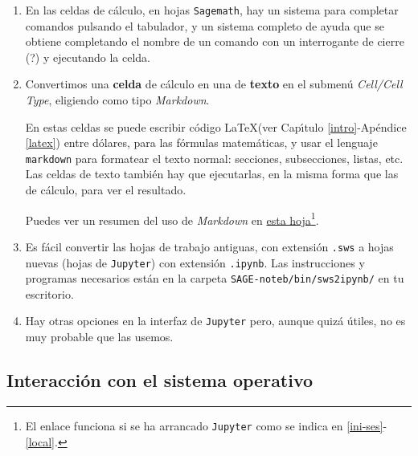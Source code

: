 \begin{enumerate}
\item En las celdas de c\'alculo, en hojas {\tt Sagemath},  hay un sistema para completar comandos pulsando el tabulador, y un sistema completo de ayuda que se obtiene completando el nombre de un comando con un interrogante de cierre (?) y ejecutando la celda. 



\item Convertimos una {\bf celda} de c\'alculo en una de {\bf texto} en el submen\'u {\itshape Cell/Cell Type}, eligiendo como tipo {\itshape Markdown}.

En estas celdas se puede escribir c\'odigo {\LaTeX}(ver Cap\'{\i}tulo \ref{intro}-Ap\'endice \ref{latex}) entre d\'olares, para las f\'ormulas matem\'aticas, y usar el lenguaje {\tt markdown} para formatear el texto normal: secciones, subsecciones, listas, etc.
Las celdas de texto tambi\'en hay que ejecutarlas, en la misma forma que las de c\'alculo, para ver el resultado. 

Puedes ver un resumen  del uso de {\itshape Markdown} en 
\href{http://localhost:8888/notebooks/INTRO/markdown.ipynb}{esta hoja}\footnote{El enlace funciona si se ha arrancado {\tt Jupyter} como se indica en  \ref{ini-ses}-\ref{local}.}.


\item Es f\'acil convertir las hojas de trabajo antiguas, con extensi\'on {\tt .sws} a hojas nuevas (hojas de {\tt Jupyter}) con extensi\'on {\tt .ipynb}. Las instrucciones y programas necesarios est\'an en la carpeta {\tt SAGE-noteb/bin/sws2ipynb/}  en tu escritorio. 



\item Hay otras opciones en la interfaz de {\tt Jupyter} pero, aunque quiz\'a \'utiles,  no es muy probable que las usemos.

\end{enumerate}


\subsection{Interacci\'on con el sistema operativo}\label{inter}

